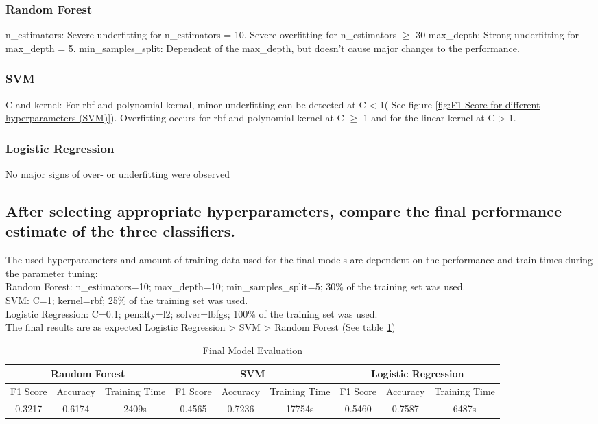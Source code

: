 \subsubsection*{Random Forest}
n\_estimators: Severe underfitting for  n\_estimators = 10. Severe overfitting for n\_estimators $\geq$ 30
max\_depth: Strong underfitting for max\_depth = 5.
min\_samples\_split: Dependent of the max\_depth, but doesn't cause major changes to the performance.

\subsubsection*{SVM}
C and kernel:  For rbf and polynomial kernal, minor underfitting can be detected at C < 1( See figure \ref{fig:F1 Score for different hyperparameters (SVM)}). Overfitting occurs for rbf and polynomial kernel at C $\geq$ 1 and for the linear kernel at C > 1.

\subsubsection*{Logistic Regression}
No major signs of over- or underfitting were observed

\subsection{After selecting appropriate hyperparameters, compare the final performance estimate of the three classifiers. }
\label{sec:Experiments:b}

The used hyperparameters and amount of training data used for the final models are dependent on the performance and train times during the parameter tuning:\\
Random Forest: n\_estimators=10; max\_depth=10; min\_samples\_split=5; 30\% of the training set was used.\\
SVM: C=1; kernel=rbf; 25\% of the training set was used.\\
Logistic Regression: C=0.1; penalty=l2; solver=lbfgs; 100\% of the training set was used.\\

The final results are as expected Logistic Regression > SVM > Random Forest (See table \ref{tab:Final Model Evaluation})
\begin{table}[htbp]
    \centering
    \begin{tabular}{ccccccccc}\toprule
         \multicolumn{3}{c}{Random Forest}&  \multicolumn{3}{c}{SVM}&  \multicolumn{3}{c}{Logistic Regression}\\\midrule
         F1 Score&  Accuracy&  Training Time&  F1 Score&  Accuracy&  Training Time&  F1 Score&  Accuracy& Training Time\\
         0.3217&  0.6174&  2409s&  0.4565&  0.7236&  17754s&  0.5460&  0.7587& 6487s\\ \bottomrule
    \end{tabular}
    \caption{Final Model Evaluation}
    \label{tab:Final Model Evaluation}
\end{table}
